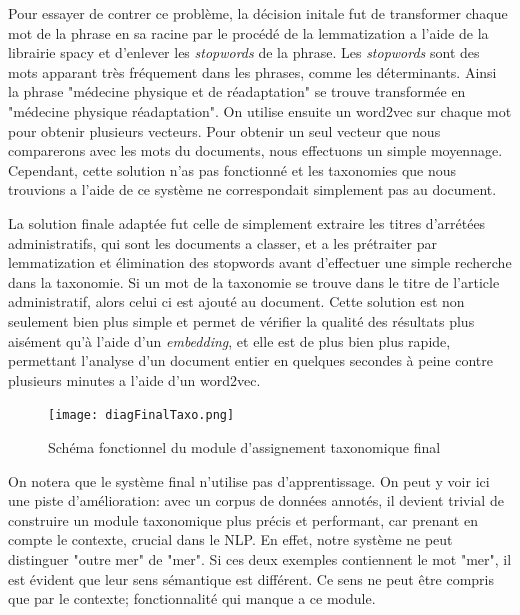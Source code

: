 Pour essayer de contrer ce problème, la décision initale fut de transformer chaque mot de la phrase en sa racine par le procédé de la lemmatization a l'aide de la librairie spacy\cite{spacy} et d'enlever les \textit{stopwords} de la phrase.
Les \textit{stopwords} sont des mots apparant très fréquement dans les phrases, comme les déterminants.
Ainsi la phrase "médecine physique et de réadaptation" se trouve transformée en "médecine physique réadaptation".
On utilise ensuite un word2vec sur chaque mot pour obtenir plusieurs vecteurs. Pour obtenir un seul vecteur que nous comparerons avec les mots du documents, nous effectuons un simple moyennage.
Cependant, cette solution n'as pas fonctionné et les taxonomies que nous trouvions a l'aide de ce système ne correspondait simplement pas au document. 

La solution finale adaptée fut celle de simplement extraire les titres d'arrétées administratifs, qui sont les documents a classer, et a les prétraiter par lemmatization et élimination des stopwords avant d'effectuer une simple recherche dans la taxonomie.
Si un mot de la taxonomie se trouve dans le titre de l'article administratif, alors celui ci est ajouté au document.
Cette solution est non seulement bien plus simple et permet de vérifier la qualité des résultats plus aisément qu'à l'aide d'un \textit{embedding}, et elle est de plus bien plus rapide, permettant l'analyse d'un document entier en quelques secondes à peine contre plusieurs minutes a l'aide d'un word2vec.

\begin{figure}[h!]
  \centering
  \texttt{[image: diagFinalTaxo.png]}
	\caption[]{Schéma fonctionnel du module d'assignement taxonomique final}
  \label{taxoFinal}
\end{figure}

On notera que le système final n'utilise pas d'apprentissage.
On peut y voir ici une piste d'amélioration: avec un corpus de données annotés, il devient trivial de construire un module taxonomique plus précis et performant, car prenant en compte le contexte, crucial dans le NLP.
En effet, notre système ne peut distinguer "outre mer" de "mer". Si ces deux exemples contiennent le mot "mer", il est évident que leur sens sémantique est différent.
Ce sens ne peut être compris que par le contexte; fonctionnalité qui manque a ce module. 




